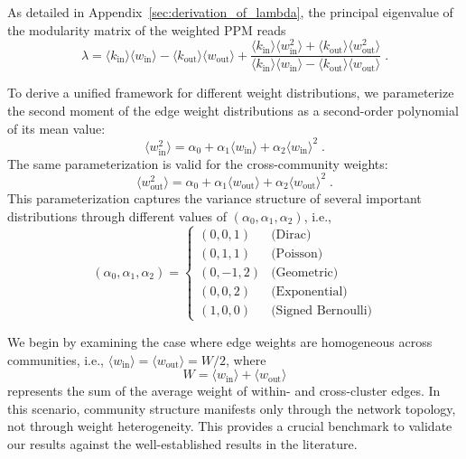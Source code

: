 \documentclass[a4paper,pre,superscriptaddress,floatfix,nofootinbib,twocolumn]{revtex4-1}
\begin{document}
As detailed in Appendix~\ref{sec:derivation_of_lambda}, the principal eigenvalue of the modularity matrix of the weighted PPM reads
\begin{equation}
\lambda = \langle k_{\text{in}} \rangle \langle w_\text{in} \rangle - \langle k_{\text{out}} \rangle \langle w_\text{out} \rangle + \frac{\langle k_{\text{in}} \rangle \langle w^2_\text{in} \rangle + \langle k_{\text{out}} \rangle \langle w^2_\text{out} \rangle}{\langle k_{\text{in}} \rangle \langle w_\text{in} \rangle - \langle k_{\text{out}} \rangle \langle w_\text{out} \rangle} \; .
\label{eq:main_equation}
\end{equation}





To derive a unified framework for different weight distributions, we parameterize the second moment of the edge weight
distributions as a second-order polynomial of its mean value:
\begin{equation}
\langle w^2_\text{in} \rangle =
\alpha_0 + \alpha_1 \langle w_\text{in} \rangle + \alpha_2 \langle w_\text{in} \rangle^2
\; .
\label{eq:second_order_polynomial}
\end{equation}
The same parameterization is valid for the cross-community weights:
\begin{equation}
\langle w^2_\text{out} \rangle
= \alpha_0 + \alpha_1 \langle w_\text{out} \rangle + \alpha_2 \langle w_\text{out} \rangle^2 \; .
\label{eq:second_order_polynomial_out}
\end{equation}
This parameterization captures the variance structure of several important distributions through different values of $(\alpha_0, \alpha_1, \alpha_2)$, i.e.,
\begin{equation}
    (\alpha_0, \alpha_1, \alpha_2) =
    \left\{
    \begin{array}{ll}
        (0, 0, 1) & \text{(Dirac)} \\
        (0, 1, 1) & \text{(Poisson)} \\
        (0, -1, 2) & \text{(Geometric)} \\
        (0, 0, 2) & \text{(Exponential)} \\
        (1, 0, 0) & \text{(Signed Bernoulli)}
    \end{array}
    \right.
    \label{eq:second_order_polynomial_family}
\end{equation}

We begin by examining the case where edge weights are homogeneous across communities, i.e.,
$\langle w_\text{in} \rangle = \langle w_\text{out} \rangle = W/2$,
where
\begin{equation}
W = \langle w_\text{in} \rangle + \langle w_\text{out} \rangle
\label{eq:omega}
\end{equation}
represents the sum of the average  weight
of within- and cross-cluster edges.
In this scenario, community structure manifests only through the network topology, not through weight heterogeneity. This provides a crucial benchmark to validate our results against the well-established results in the literature.
\end{document}
